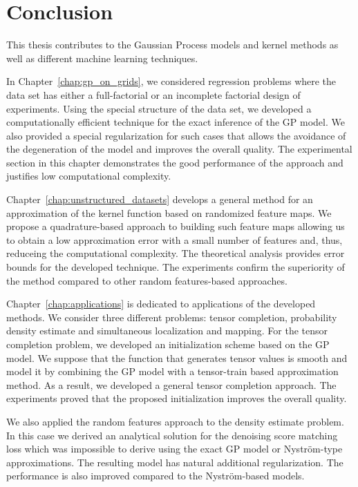 \chapter{Conclusion}
\label{sec:conclusion}

This thesis contributes to the Gaussian Process models and kernel methods
as well as different machine learning techniques.

In Chapter~\ref{chap:gp_on_grids}, we considered regression problems
where the data set has either a full-factorial or an incomplete factorial
design of experiments.
Using the special structure of the data set, we developed
a computationally efficient technique for the exact inference of the GP model.
We also provided a special regularization for such cases
that allows the avoidance of the degeneration of the model and improves the overall quality.
The experimental section in this chapter demonstrates
the good performance of the approach and justifies low computational complexity.

Chapter~\ref{chap:unstructured_datasets} develops a general method
for an approximation of the kernel function based on randomized feature maps.
We propose a quadrature-based approach to building such feature maps
allowing us to obtain a low approximation error with a small number of features
and, thus, reduceing the computational complexity.
The theoretical analysis provides error bounds for the developed technique.
The experiments confirm the superiority of the method compared to other
random features-based approaches.

Chapter~\ref{chap:applications} is dedicated to applications of the developed methods.
We consider three different problems: tensor completion, probability density estimate
and simultaneous localization and mapping.
For the tensor completion problem, we developed an initialization scheme based on the
GP model.
We suppose that the function that generates tensor values is smooth and
model it by combining the GP model with a tensor-train based approximation method.
As a result, we developed a general tensor completion approach.
The experiments proved that the proposed initialization improves the overall quality.

We also applied the random features approach to the density estimate problem.
In this case we derived an analytical solution for the denoising score matching loss
which was impossible to derive using the exact GP model or Nystr{\"o}m-type approximations.
The resulting model has natural additional regularization.
The performance is also improved compared to the Nystr{\"o}m-based models.

